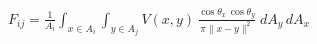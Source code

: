 \documentclass[border=6pt]{standalone}
\begin{document}
\color{white}
\(\displaystyle
F_{ij}
=
\frac{1}{A_i}
\int_{x\in A_i}
\int_{y\in A_j}
V(x,y)\,
\frac{\cos\theta_x\,\cos\theta_y}{\pi \lVert x-y\rVert^2}
\;dA_y\,dA_x
\)
\end{document}
